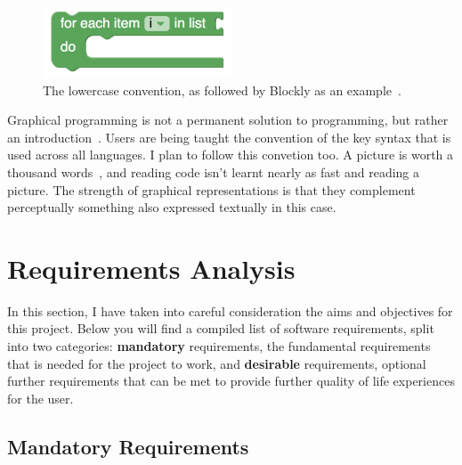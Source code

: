 \documentclass[a4paper, 12pt]{article}
\begin{document}
            \begin{figure}[h]
                \centering
                \includegraphics{lowercase_convention.png}
                \caption{The lowercase convention, as followed by Blockly as an example~\cite{pasternak2017tips}.}
            \end{figure}

            Graphical programming is not a permanent solution to programming, but rather an 
            introduction~\cite{gregoryvisual}. Users are being taught the convention of the key
            syntax that is used across all languages. I plan to follow this convetion too. A
            picture is worth a thousand words~\cite{petre1995looking}, and reading code isn't learnt
            nearly as fast and reading a picture. The strength of graphical representations is
            that they complement perceptually something also expressed textually in this case.

    \clearpage
    \section{Requirements Analysis}
        In this section, I have taken into careful consideration the aims and objectives for this
        project. Below you will find a compiled list of software requirements, split into two
        categories: \textbf{mandatory} requirements, the fundamental requirements that is needed
        for the project to work, and \textbf{desirable} requirements, optional further requirements
        that can be met to provide further quality of life experiences for the user.

        \subsection{Mandatory Requirements}
\end{document}
